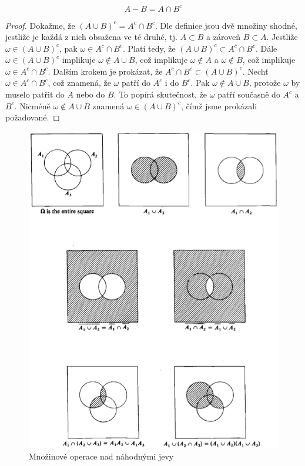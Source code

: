 \begin{theorem}
\begin{equation*}
A - B = A \cap B^c
\end{equation*}
\end{theorem}

\begin{proof}
Dokažme, že $(A \cup B)^c = A^c \cap B^c$. Dle definice jsou dvě množiny shodné, jestliže je každá z nich obsažena ve té druhé, tj. $A \subset B$ a zároveň $B \subset A$. Jestliže $\omega \in (A \cup B)^c$, pak $\omega \in A^c \cap B^c$. Platí tedy, že $(A \cup B)^c \subset A^c \cap B^c$. Dále $\omega \in (A \cup B)^c$ implikuje $\omega \notin A \cup B$, což implikuje $\omega \notin A$ a $\omega \notin B$, což implikuje $\omega \in A^c \cap B^c$. Dalším krokem je prokázat, že $A^c \cap B^c \subset (A \cup B)^c$. Nechť $\omega \in A^c \cap B^c$, což znamená, že $\omega$ patří do $A^c$ i do $B^c$. Pak $\omega \notin A \cup B$, protože $\omega$ by muselo patřit do $A$ nebo do $B$. To popírá skutečnost, že $\omega$ patří současně do $A^c$ a $B^c$. Nicméně $\omega \notin A \cup B$ znamená $\omega \in (A \cup B)^c$, čímž jsme prokázali požadované.
\end{proof}

\begin{figure}[htp]
\centering
\includegraphics[scale = 0.5]{pictures/set_operations.eps}
\caption{Množinové operace nad náhodnými jevy}
\label{set_operations}
\end{figure} 

